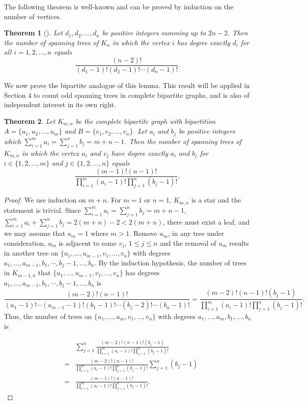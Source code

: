 \documentclass[10pt,a4paper]{article}
\newtheorem{theorem}{Theorem}[section]
\newtheorem{false statement}{False statement}
\theoremstyle{definition}
\begin{document}
The following theorem is well-known and can be proved by induction on the number of vertices. 

\begin{theorem}[\cite{Berge,Lovasz}]\label{Kn-degree}
Let $d_1,d_2,\dots,d_n$ be positive integers summing up to $2n-2$. Then the number of spanning trees of $K_n$ in which the vertex $i$ has degree exactly $d_i$ for all $i=1,2,\dots,n$ equals$$
	\dfrac{(n-2)!}{(d_1-1)!(d_2-1)!\cdots(d_n-1)!}.$$
\end{theorem}

We now prove the bipartite analogue of this lemma. This result will be applied in Section 4 to count odd spanning trees in complete bipartite graphs, and is also of independent interest in its own right.

\begin{theorem}\label{Kmn-degree}
Let $K_{m,n}$ be the complete bipartite graph with bipartition $A=\{u_1,u_2,\ldots,u_m\}$ and $B=\{v_1,v_2,\ldots,v_n\}$. Let $a_i$ and $b_j$ be positive integers which $\sum_{i=1}^{m}a_i=\sum_{j=1}^{n}b_j=m+n-1$. Then the number of spanning trees of $K_{m,n}$ in which the vertex $u_i$ and $v_j$ have degree exactly $a_i$ and $b_j$ for $i\in\{1,2,\ldots,m\}$ and $j\in\{1,2,\ldots,n\}$ equals 
    $$
	\frac{(m-1)!(n-1)!}{\prod_{i=1}^{m}(a_i-1)!\prod_{j=1}^{n}(b_j-1)!},
	$$
\end{theorem}
\begin{proof}
	We use induction on $m+n$. For $m=1$ or $n=1$, $K_{m,n}$ is a star and the statement is trivial. 
Since $\sum_{i=1}^{m}a_i=\sum_{j=1}^{n}b_j=m+n-1$,  $\sum_{i=1}^{m}a_i+\sum_{j=1}^{n}b_j=2(m+n)-2<2(m+n)$, 
there must exist a leaf, and we may assume that $a_m=1$ where $m>1$. 
Remove $u_m$, in any tree under consideration, $u_m$ is adjacent to some $v_j$, $1\leq j\leq n$ and the removal of $u_m$ results in another tree on $\{u_1,\dots,u_{m-1},v_1,\dots,v_n\}$ with degrees $a_1,\dots,a_{m-1},b_1,\cdots,b_j-1,\dots,b_n$. 
By the induction hypothesis, the number of trees in $K_{m-1,n}$ that $\{u_1,\dots,u_{m-1},v_1,\dots,v_n\}$ has degrees $a_1,\dots,a_{m-1},b_1,\cdots,b_j-1,\dots,b_n$ is
	$$\frac{(m-2)!(n-1)!}{(a_1-1)!\cdots(a_{m-1}-1)!(b_1-1)!\cdots(b_j-2)!\cdots(b_n-1)!}
		=\frac{(m-2)!(n-1)!(b_j-1)}{\prod_{i=1}^{m}(a_i-1)!\prod_{j=1}^{n}(b_j-1)!}.
	$$	
	Thus, the number of trees on $\{u_1,\dots,u_{m},v_1,\dots,v_n\}$ with degrees $a_1,\dots,a_{m},b_1,\dots,b_n$ is

\begin{eqnarray*}
\  &  & \sum_{j=1}^{n}\frac{(m-2)!(n-1)!(b_j-1)}{\prod_{i=1}^{m}(a_i-1)!\prod_{j=1}^{n}(b_j-1)!} \\
& = & \frac{(m-2)!(n-1)!}{\prod_{i=1}^{m}(a_i-1)!\prod_{j=1}^{n}(b_j-1)!}\sum_{j=1}^{n}(b_j-1) \\
& = & \frac{(m-1)!(n-1)!}{\prod_{i=1}^{m}(a_i-1)!\prod_{j=1}^{n}(b_j-1)!}.
\end{eqnarray*}
\end{proof}
\end{document}

